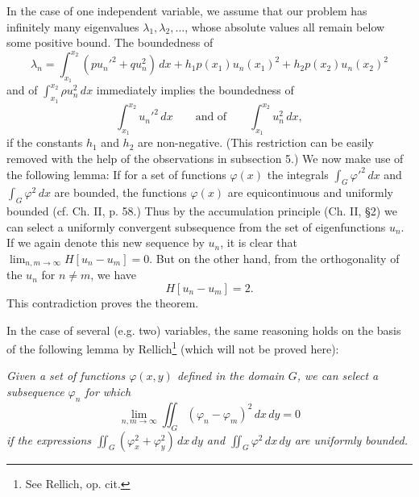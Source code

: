 In the case of one independent variable, we assume that our problem has infinitely many eigenvalues $\lambda_1,\lambda_2,\ldots$, whose absolute values all remain below some positive bound. The boundedness of
\[
\lambda_n=\int_{x_1}^{x_2}(pu_n'^2+qu_n^2)\,dx
+h_1p(x_1)u_n(x_1)^2+h_2p(x_2)u_n(x_2)^2
\]
and of $\int_{x_1}^{x_2}\rho u_n^2\,dx$ immediately implies the boundedness of
\[
\int_{x_1}^{x_2}u_n'^2\,dx
\qquad\text{and of}\qquad
\int_{x_1}^{x_2}u_n^2\,dx,
\]
if the constants $h_1$ and $h_2$ are non-negative. (This restriction can be easily removed with the help of the observations in subsection 5.) We now make use of the following lemma: If for a set of functions $\varphi(x)$ the integrals $\int_G\varphi'^2\,dx$ and $\int_G\varphi^2\,dx$ are bounded, the functions $\varphi(x)$ are equicontinuous and uniformly bounded (cf. Ch. II, p. 58.) Thus by the accumulation principle (Ch. II, \S2) we can select a uniformly convergent subsequence from the set of eigenfunctions $u_n$. If we again denote this new sequence by $u_n$, it is clear that $\lim_{n,m\to\infty}H[u_n-u_m]=0$. But on the other hand, from the orthogonality of the $u_n$ for $n\ne m$, we have
\[
H[u_n-u_m]=2.
\]
This contradiction proves the theorem.

In the case of several (e.g. two) variables, the same reasoning holds on the basis of the following lemma by Rellich\footnote{See Rellich, op. cit.} (which will not be proved here):

\emph{Given a set of functions $\varphi(x,y)$ defined in the domain $G$, we can select a subsequence $\varphi_n$ for which}
\[
\lim_{n,m\to\infty}\iint_G(\varphi_n-\varphi_m)^2\,dx\,dy=0
\]
\emph{if the expressions $\iint_G(\varphi_x^2+\varphi_y^2)\,dx\,dy$ and $\iint_G\varphi^2\,dx\,dy$ are uniformly bounded.}

